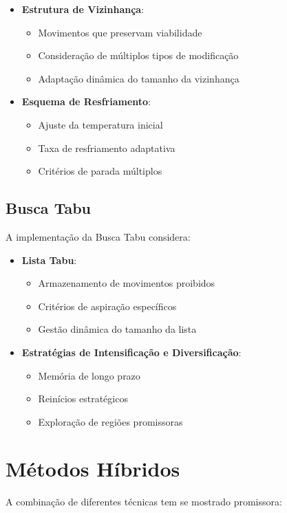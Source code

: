 \documentclass[12pt, a4paper]{report}
\begin{document}
\begin{itemize}
    \item \textbf{Estrutura de Vizinhança}:
    \begin{itemize}
        \item Movimentos que preservam viabilidade
        \item Consideração de múltiplos tipos de modificação
        \item Adaptação dinâmica do tamanho da vizinhança
    \end{itemize}
    
    \item \textbf{Esquema de Resfriamento}:
    \begin{itemize}
        \item Ajuste da temperatura inicial
        \item Taxa de resfriamento adaptativa
        \item Critérios de parada múltiplos
    \end{itemize}
\end{itemize}

\subsection{Busca Tabu}
A implementação da Busca Tabu considera:

\begin{itemize}
    \item \textbf{Lista Tabu}:
    \begin{itemize}
        \item Armazenamento de movimentos proibidos
        \item Critérios de aspiração específicos
        \item Gestão dinâmica do tamanho da lista
    \end{itemize}
    
    \item \textbf{Estratégias de Intensificação e Diversificação}:
    \begin{itemize}
        \item Memória de longo prazo
        \item Reinícios estratégicos
        \item Exploração de regiões promissoras
    \end{itemize}
\end{itemize}

\section{Métodos Híbridos}
A combinação de diferentes técnicas tem se mostrado promissora:
\end{document}
